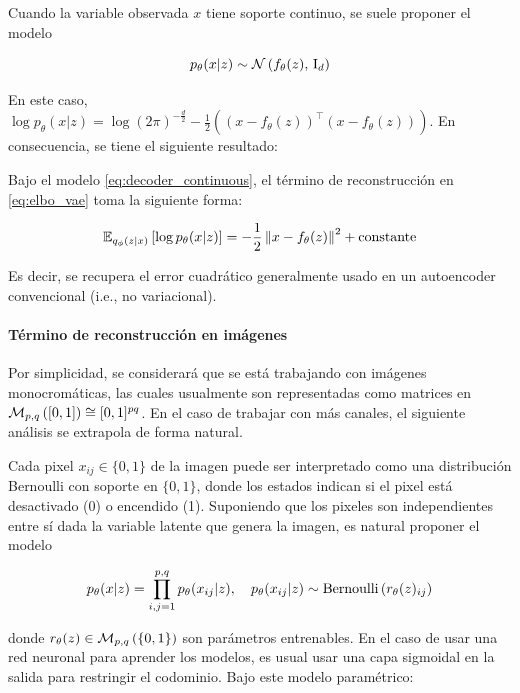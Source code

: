 Cuando la variable observada $x$ tiene soporte continuo, se suele proponer el modelo

\begin{equation}
    \label{eq:decoder_continuous}
	p_\theta(x|z)\sim\mathcal{N}\left(f_\theta(z),\,\operatorname{I}_{d}\right)
\end{equation}

En este caso, $\log p_\theta(x|z) = \log (2\pi)^{-\frac{d}{2}} - \frac{1}{2}\left((x-f_\theta(z))^\top (x-f_\theta(z))\right)$. En consecuencia, se tiene el siguiente resultado:

\begin{prop}
	Bajo el modelo \eqref{eq:decoder_continuous}, el término de reconstrucción en \eqref{eq:elbo_vae} toma la siguiente forma:

	\begin{equation*}
		\mathbb{E}_{q_\phi(z|x)}\left[\log p_\theta(x|z)\right] = -\frac{1}{2} \left\lVert x-f_\theta(z) \right\rVert^2 + \operatorname{constante}
	\end{equation*}

	Es decir, se recupera el error cuadrático generalmente usado en un autoencoder convencional (i.e., no variacional).
\end{prop}

\paragraph{Término de reconstrucción en imágenes}

Por simplicidad, se considerará que se está trabajando con imágenes monocromáticas, las cuales usualmente son representadas como matrices en $\mathcal{M}_{p,q}\left([0,1]\right)\cong [0,1]^{pq}$. En el caso de trabajar con más canales, el siguiente análisis se extrapola de forma natural.

Cada pixel $x_{ij}\in\{0,1\}$ de la imagen puede ser interpretado como una distribución Bernoulli con soporte en $\{0,1\}$, donde los estados indican si el pixel está desactivado (0) o encendido (1). Suponiendo que los pixeles son independientes entre sí dada la variable latente que genera la imagen, es natural proponer el modelo

\begin{equation}
    \label{eq:decoder_images}
	p_\theta(x|z)=\prod_{i,j=1}^{p,q} p_\theta(x_{ij}|z),
    \quad
	p_\theta(x_{ij}|z) \sim \operatorname{Bernoulli}\left(r_\theta(z)_{ij}\right)
\end{equation}

donde $r_\theta(z)\in\mathcal{M}_{p,q}\left(\{0,1\}\right)$ son parámetros entrenables. En el caso de usar una red neuronal para aprender los modelos, es usual usar una capa sigmoidal en la salida para restringir el codominio. Bajo este modelo paramétrico:

